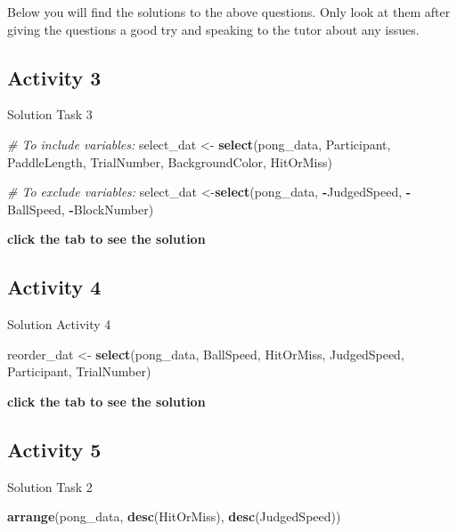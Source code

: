 \documentclass[]{book}
\newenvironment{Shaded}{\begin{snugshade}}{\end{snugshade}}
\newcommand{\CommentTok}[1]{\textcolor[rgb]{0.56,0.35,0.01}{\textit{#1}}}
\newcommand{\KeywordTok}[1]{\textcolor[rgb]{0.13,0.29,0.53}{\textbf{#1}}}
\newcommand{\NormalTok}[1]{#1}
\newcommand{\OperatorTok}[1]{\textcolor[rgb]{0.81,0.36,0.00}{\textbf{#1}}}
\newcommand{\StringTok}[1]{\textcolor[rgb]{0.31,0.60,0.02}{#1}}
\begin{document}
Below you will find the solutions to the above questions. Only look at them after giving the questions a good try and speaking to the tutor about any issues.

\hypertarget{activity-3}{%
\subsection{Activity 3}\label{activity-3}}

Solution Task 3

\begin{Shaded}
\begin{Highlighting}[]
\CommentTok{# To include variables:}
\NormalTok{select_dat <-}\StringTok{ }\KeywordTok{select}\NormalTok{(pong_data, Participant, PaddleLength, TrialNumber, BackgroundColor, HitOrMiss)}

\CommentTok{# To exclude variables:}
\NormalTok{select_dat <-}\KeywordTok{select}\NormalTok{(pong_data, }\OperatorTok{-}\NormalTok{JudgedSpeed, }\OperatorTok{-}\NormalTok{BallSpeed, }\OperatorTok{-}\NormalTok{BlockNumber)}
\end{Highlighting}
\end{Shaded}

\textbf{click the tab to see the solution}

\hypertarget{activity-4}{%
\subsection{Activity 4}\label{activity-4}}

Solution Activity 4

\begin{Shaded}
\begin{Highlighting}[]
\NormalTok{reorder_dat <-}\StringTok{ }\KeywordTok{select}\NormalTok{(pong_data, BallSpeed, HitOrMiss, JudgedSpeed, Participant, TrialNumber)}
\end{Highlighting}
\end{Shaded}

\textbf{click the tab to see the solution}

\hypertarget{activity-5}{%
\subsection{Activity 5}\label{activity-5}}

Solution Task 2

\begin{Shaded}
\begin{Highlighting}[]
\KeywordTok{arrange}\NormalTok{(pong_data, }\KeywordTok{desc}\NormalTok{(HitOrMiss), }\KeywordTok{desc}\NormalTok{(JudgedSpeed))}
\end{Highlighting}
\end{Shaded}
\end{document}
